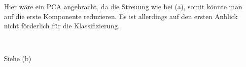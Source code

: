 Hier wäre ein PCA angebracht, da die Streuung wie bei (a), somit könnte man auf die erste Komponente reduzieren. Es ist allerdings auf den ersten Anblick nicht förderlich für die Klassifizierung.
\begin{center}
	\\
\end{center}
Siehe (b)
